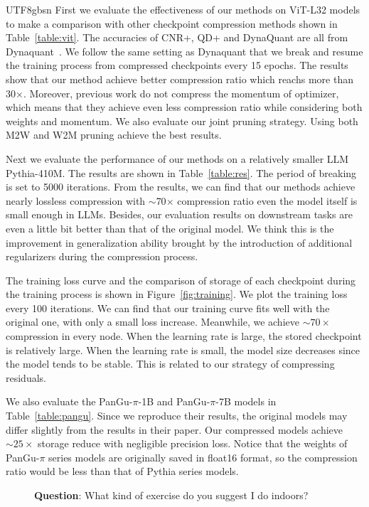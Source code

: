 \documentclass{article}
\theoremstyle{plain}
\theoremstyle{definition}
\theoremstyle{remark}
\begin{document}
\begin{CJK}{UTF8}{gbsn}
First we evaluate the effectiveness of our methods on ViT-L32 models to make a comparison with other checkpoint compression methods shown in Table~\ref{table:vit}. The accuracies of CNR+, QD+ and DynaQuant are all from Dynaquant~\cite{dynaquant}. We follow the same setting as Dynaquant that we break and resume the training process from compressed checkpoints every 15 epochs. The results show that our method achieve better compression ratio which reachs more than 30$\times$. Moreover, previous work do not compress the momentum of optimizer, which means that they achieve even less compression ratio while considering both weights and momentum. We also evaluate our joint pruning strategy. Using both M2W and W2M pruning achieve the best results.

Next we evaluate the performance of our methods on a relatively smaller LLM Pythia-410M. The results are shown in Table~\ref{table:res}. The period of breaking is set to 5000 iterations. From the results, we can find that our methods achieve nearly lossless compression with $\sim$70$\times$ compression ratio even the model itself is small enough in LLMs. Besides, our evaluation results on downstream tasks are even a little bit better than that of the original model. We think this is the improvement in generalization ability brought by the introduction of additional regularizers during the compression process. %


The training loss curve and the comparison of storage of each checkpoint during the training process is shown in Figure~\ref{fig:training}. We plot the training loss every 100 iterations. We can find that our training curve fits well with the original one, with only a small loss increase. Meanwhile, we achieve $\sim70\times$ compression in every node. %
When the learning rate is large, the stored checkpoint is relatively large. When the learning rate is small, the model size decreases since the model tends to be stable. This is related to our strategy of compressing residuals.


We also evaluate the PanGu-$\pi$-1B and PanGu-$\pi$-7B models in Table~\ref{table:pangu}. Since we reproduce their results, the original models may differ slightly from the results in their paper. Our compressed models achieve $\sim25\times$ storage reduce with negligible precision loss. Notice that the weights of PanGu-$\pi$ series models are originally saved in float16 format, so the compression ratio would be less than that of Pythia series models.

\begin{figure}[th]
\begin{center}
	\begin{tcolorbox}[colback=gray!10,%
		colframe=black,%
		width=16cm,%
		arc=1mm, auto outer arc,
		boxrule=0.8pt,
		]
		\textbf{Question}: What kind of exercise do you suggest I do indoors?\\


\end{tcolorbox}
\end{center}
\end{figure}
\end{CJK}
\end{document}
